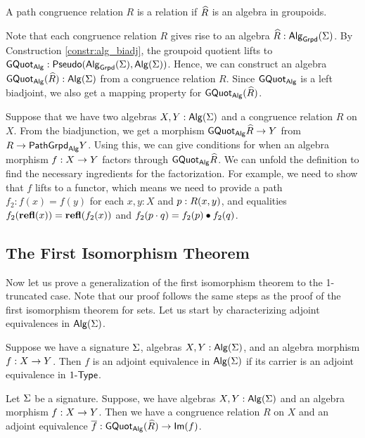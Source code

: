 \begin{definition}
A path congruence relation $R$ is a  relation if $\widehat{R}$ is an algebra in groupoids.
\end{definition}

Note that each congruence relation $R$ gives rise to an algebra $\widehat{R} : \mathsf{Alg}_{\mathsf{Grpd}}(\Sigma)$.
By Construction \ref{constr:alg_biadj}, the groupoid quotient lifts to $\mathsf{GQuot}_{\mathsf{Alg}} : \mathsf{Pseudo}(\mathsf{Alg}_{\mathsf{Grpd}}(\Sigma), \mathsf{Alg}(\Sigma))$.
Hence, we can construct an algebra $\mathsf{GQuot}_{\mathsf{Alg}}(\widehat{R}) : \mathsf{Alg}(\Sigma)$ from a congruence relation $R$.
Since $\mathsf{GQuot}_{\mathsf{Alg}}$ is a left biadjoint, we also get a mapping property for $\mathsf{GQuot}_{\mathsf{Alg}}(\widehat{R})$.

\begin{remark}
\label{remark:mapping_property_congruence}
Suppose that we have two algebras $X, Y : \mathsf{Alg}(\Sigma)$ and a congruence relation $R$ on $X$.
From the biadjunction, we get a morphism $\mathsf{GQuot}_{\mathsf{Alg}}{\widehat{R}} \rightarrow Y$ from $R \rightarrow \mathsf{PathGrpd}_{\mathsf{Alg}}{Y}$.
Using this, we can give conditions for when an algebra morphism $f : X \rightarrow Y$ factors through $\mathsf{GQuot}_{\mathsf{Alg}}{\widehat{R}}$.
We can unfold the definition to find the necessary ingredients for the factorization.
For example, we need to show that $f$ lifts to a functor, which means we need to provide a path $f_2 : f(x) = f(y)$ for each $x, y : X$ and $p : R(x, y)$, and equalities $f_2(\operatorname{\mathbf{refl}}(x)) =\operatorname{\mathbf{refl}}(f_2(x))$ and $f_2(p \cdot q) = f_2(p) \bullet f_2(q)$.
\end{remark}

\subsection{The First Isomorphism Theorem}
Now let us prove a generalization of the first isomorphism theorem to the 1-truncated case.
Note that our proof follows the same steps as the proof of the first isomorphism theorem for sets.
Let us start by characterizing adjoint equivalences in $\mathsf{Alg}(\Sigma)$.

\begin{proposition}
\label{prop:algebra_adjequiv}
Suppose we have a signature $\Sigma$, algebras $X, Y : \mathsf{Alg}(\Sigma)$, and an algebra morphism $f : X \rightarrow Y$.
Then $f$ is an adjoint equivalence in $\mathsf{Alg}(\Sigma)$ if its carrier is an adjoint equivalence in $1\mbox{-}\mathsf{Type}$.
\end{proposition}

\begin{theorem}\label{thm:iso_thm}
Let $\Sigma$ be a signature.
Suppose, we have algebras $X, Y : \mathsf{Alg}(\Sigma)$ and an algebra morphism $f : X \rightarrow Y$.
Then we have a congruence relation $R$ on $X$ and an adjoint equivalence $\overline{f} : \mathsf{GQuot}_{\mathsf{Alg}}(\widehat{R}) \rightarrow \mathsf{Im}(f)$.
\end{theorem}

